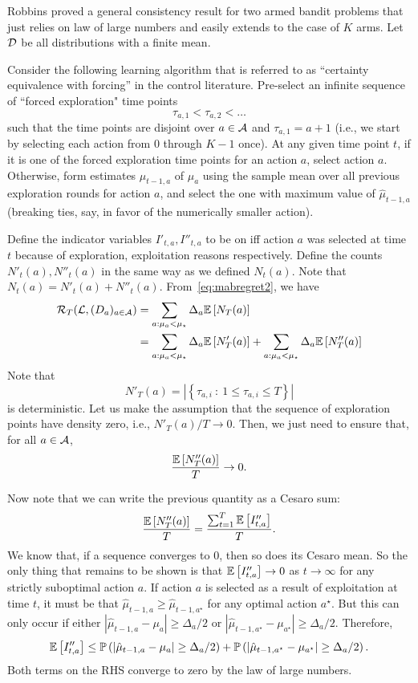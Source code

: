 \documentclass[11pt]{article}
\begin{document}
Robbins \cite{robbins1952some} proved a general consistency result for two armed bandit problems that just relies on law of large numbers and easily extends to the case of $K$ arms.
Let $\mathcal{D}$ be all distributions with a finite mean.

Consider the following learning algorithm that is referred to as ``certainty equivalence with forcing'' in the control literature. Pre-select an infinite sequence of ``forced exploration" time points
\[
\tau_{a,1} < \tau_{a,2} < \ldots
\]
such that the time points are disjoint over $a \in \mathcal{A}$ and $\tau_{a,1} = a+1$ (i.e., we start by selecting each action from $0$ through $K-1$ once). At any given time point $t$, if it is one
of the forced exploration time points for an action $a$, select action $a$. Otherwise, form estimates $\hat{\mu}_{t-1,a}$ of $\mu_a$ using the sample mean over all previous exploration rounds for action $a$, and select the
one with maximum value of $\hat{\mu}_{t-1,a}$ (breaking ties, say, in favor of the numerically smaller action).

Define the indicator variables $I'_{t,a}, I''_{t,a}$ to be on iff action $a$ was selected at time $t$ because of exploration, exploitation reasons respectively. Define the counts $N'_t(a), N''_t(a)$ in the same way as we defined
$N_t(a)$. Note that $N_t(a) = N'_t(a) + N''_t(a)$. From~\eqref{eq:mabregret2}, we have
\begin{align*}
\mathcal{R}_T(\mathcal{L}, (D_a)_{a \in \mathcal{A}}) &= \sum_{a: \mu_a < \mu_\star} \Delta_a \mathbb{E}\left[ N_T(a) \right] \\
&= \sum_{a: \mu_a < \mu_\star} \Delta_a \mathbb{E}\left[ N'_T(a) \right] + \sum_{a: \mu_a < \mu_\star} \Delta_a \mathbb{E}\left[ N''_T(a) \right] 
\end{align*}
Note that
\[
N'_T(a) = |\left\{ \tau_{a,i} \::\: 1 \le \tau_{a,i} \le T \right\}|
\]
is deterministic. Let us make the assumption that the sequence of exploration points have density zero, i.e., $N'_T(a)/T \to 0$. Then, we just need to ensure that, for all $a \in \mathcal{A}$,
\[
\frac{ \mathbb{E}\left[ N''_T(a) \right] }{T} \to 0 .
\]

Now note that we can write the previous quantity as a Cesaro sum:
\[
\frac{ \mathbb{E}\left[ N''_T(a) \right] }{T} = \frac{\sum_{t=1}^T \mathbb{E}\left[ I''_{t,a} \right]} {T} .
\]
We know that, if a sequence converges to $0$, then so does its Cesaro mean. So the only thing that remains to be shown is that $\mathbb{E}\left[ I''_{t,a} \right] \to 0$ as $t \to \infty$ for any 
strictly suboptimal action $a$. If action $a$ is selected as a result of exploitation at time $t$, it must be that $\hat{\mu}_{t-1,a} \ge \hat{\mu}_{t-1,a^\star}$ for any optimal
action $a^\star$. But this can only occur if either $|\hat{\mu}_{t-1,a} - \mu_a| \ge \Delta_a/2$ or $|\hat{\mu}_{t-1,a^\star} - \mu_{a^\star}| \ge \Delta_a/2$. Therefore,
\[
\mathbb{E}\left[ I''_{t,a} \right] \le \mathbb{P}\left( |\hat{\mu}_{t-1,a} - \mu_a| \ge \Delta_a/2 \right) + \mathbb{P}\left( |\hat{\mu}_{t-1,a^\star} - \mu_{a^\star}| \ge \Delta_a/2 \right) .
\]
Both terms on the RHS converge to zero by the law of large numbers.


\end{document}
